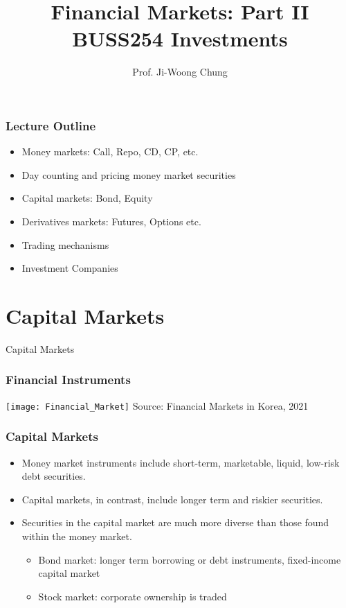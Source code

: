 \documentclass[10pt]{beamer}
\title{Financial Markets: Part II \\
	\vspace{5pt} {\footnotesize BUSS254 Investments}}
\author{Prof. Ji-Woong Chung}
\institute{}
\date{}
\begin{document}
	
	\frame{\titlepage}
	\graphicspath{{figures//}}
	
	
	\begin{frame}
		\frametitle{Lecture Outline}
		\begin{itemize}\itemsep15pt
			\item Money markets: Call, Repo, CD, CP, etc.
			\item Day counting and pricing money market securities
			\item Capital markets: Bond, Equity
			\item Derivatives markets: Futures, Options etc.
			\item Trading mechanisms
			\item Investment Companies
		\end{itemize}
	\end{frame}
	
	
	
	\section{Capital Markets}
	\begin{frame}
		\begin{center}
			{\Large Capital Markets}
		\end{center}
	\end{frame}
	
	
	
	\begin{frame}
		\frametitle{Financial Instruments} \vspace{-10pt}
		\begin{center}
			\texttt{[image: Financial\_Market]}
			{\scriptsize Source: Financial Markets in Korea, 2021}		
		\end{center}
		
	\end{frame}
	
	
	\begin{frame}
		\frametitle{Capital Markets}
		
		\begin{itemize} \vspace{5pt} \itemsep10pt
			\item Money market instruments include short-term, marketable,
			liquid, low-risk debt securities. 
			\item Capital markets, in contrast, include longer term and riskier	securities. 
			\item Securities in the capital market are
			much more diverse than those found within the
			money market. 
			\begin{itemize} \vspace{5pt} \itemsep10pt
				\item Bond market: longer term borrowing or debt instruments, fixed-income capital market
				\item Stock market: corporate ownership is traded
			\end{itemize}
			
			
		\end{itemize}
		
	\end{frame}
	
\end{document}
